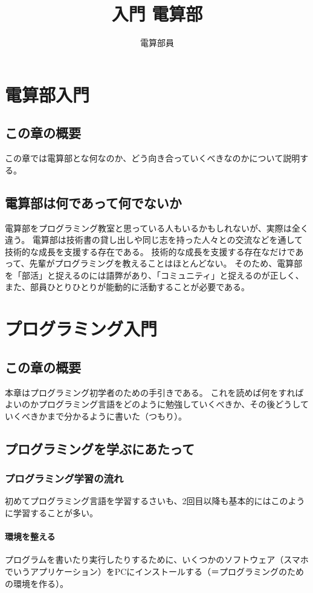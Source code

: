 \documentclass[lualatex,ja=standard,12pt,a4j]{bxjsbook}
\title{入門 電算部}
\author{電算部員}
\begin{document}
	\tableofcontents
	\chapter{電算部入門}
		\section{この章の概要}
			この章では電算部とな何なのか、どう向き合っていくべきなのかについて説明する。
		\section{電算部は何であって何でないか}
			電算部をプログラミング教室と思っている人もいるかもしれないが、実際は全く違う。
			電算部は技術書の貸し出しや同じ志を持った人々との交流などを通して技術的な成長を支援する存在である。
			技術的な成長を支援する存在なだけであって、先輩がプログラミングを教えることはほとんどない。
			そのため、電算部を「部活」と捉えるのには語弊があり、「コミュニティ」と捉えるのが正しく、
			また、部員ひとりひとりが能動的に活動することが必要である。
	\chapter{プログラミング入門}
		\section{この章の概要}
                本章はプログラミング初学者のための手引きである。
                これを読めば何をすればよいのかプログラミング言語をどのように勉強していくべきか、その後どうしていくべきかまで分かるように書いた（つもり）。
		\section{プログラミングを学ぶにあたって}
			\subsection{プログラミング学習の流れ}
				初めてプログラミング言語を学習するさいも、2回目以降も基本的にはこのように学習することが多い。
				\subsubsection{環境を整える}
					プログラムを書いたり実行したりするために、いくつかのソフトウェア（スマホでいうアプリケーション）をPCにインストールする（＝プログラミングのための環境を作る）。
	                
\end{document}
